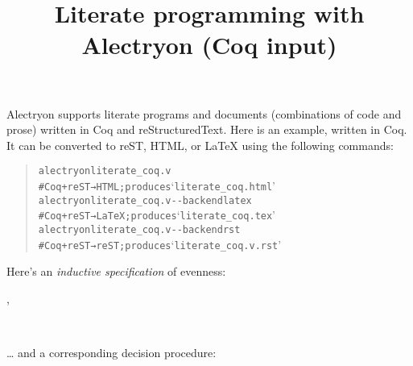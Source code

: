 \documentclass[a4paper]{article}
\providecommand*{\DUtransition}{%
  \hspace*{\fill}\hrulefill\hspace*{\fill}
  \vskip 0.5\baselineskip
}
\begin{document}
\title{Literate programming with Alectryon (Coq input)%
  \label{literate-programming-with-alectryon-coq-input}}
\author{}
\date{}
\maketitle

Alectryon supports literate programs and documents (combinations of code and prose) written in Coq and reStructuredText.  Here is an example, written in Coq.  It can be converted to reST, HTML, or LaTeX using the following commands:

\begin{quote}
\begin{alltt}
alectryon literate_coq.v
  # Coq+reST → HTML;  produces ‘literate_coq.html’
alectryon literate_coq.v -{}-backend latex
  # Coq+reST → LaTeX; produces ‘literate_coq.tex’
alectryon literate_coq.v -{}-backend rst
  # Coq+reST → reST;  produces ‘literate_coq.v.rst’
\end{alltt}
\end{quote}

\DUtransition

Here's an \emph{inductive specification} of evenness:

\begin{alectryon}
  \sep
  \begin{sentence}
    \begin{input}
      ~~~~~~\nl
      ~~~~\nl
      ~~~~~~~~~~~
    \end{input}
  \end{sentence}
\end{alectryon}

… and a corresponding decision procedure:
\end{document}
